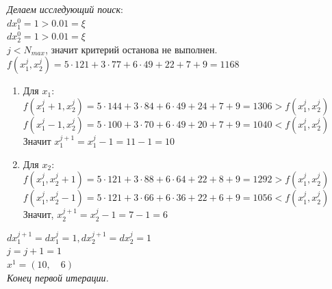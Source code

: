 \begin{itemize}
    {\it Делаем исследующий поиск}: \\
    $dx^{0}_{1} = 1 > 0.01 = \xi$\\
    $dx^{0}_{2} = 1 > 0.01 = \xi$ \\
    $j < N_{max}$, значит критерий останова не выполнен. \\
    
    $f(x^{j}_1, x^{j}_2) = 5\cdot121 + 3\cdot77 + 6\cdot49 + 22 + 7 + 9 = 1168$
    \begin{enumerate}
        \item Для $x_1$: \\
        $f(x^{j}_1 + 1, x^{j}_2) = 5\cdot144 + 3\cdot84 + 6\cdot49 + 24 + 7 + 9 = 1306 > f(x^{j}_1, x^{j}_2)$ \\ 
        $f(x^{j}_1 - 1, x^{j}_2) = 5\cdot100 + 3\cdot70 + 6\cdot49 + 20 + 7 + 9 = 1040 < f(x^{j}_1, x^{j}_2)$ \\
        Значит $x^{j + 1}_1 = x^{j}_1 - 1 = 11 - 1 = 10$
        \item Для $x_2$: \\
        $f(x^{j}_1, x^{j}_2 + 1) = 5\cdot121 + 3\cdot88 + 6\cdot64 + 22 + 8 + 9 = 1292 > f(x^{j}_1, x^{j}_2)$ \\
        $f(x^{j}_1, x^{j}_2 - 1) = 5\cdot121 + 3\cdot66 + 6\cdot36 + 22 + 6 + 9 = 1056 < f(x^{j}_1, x^{j}_2)$ \\
        Значит, $x^{j + 1}_2 = x^{j}_2 - 1 = 7 - 1 = 6$
    \end{enumerate}
    $dx^{j + 1}_{1} = dx^{j}_{1} = 1, dx^{j + 1}_{2} = dx^{j}_{2}  = 1$\\
    $j = j + 1 = 1$ \\
    $x^1 = (10, \quad 6)$ \\
    {\it Конец первой итерации.}
    

\end{itemize}
